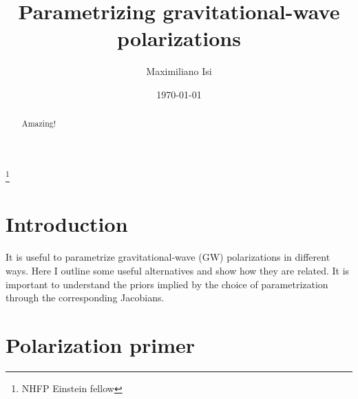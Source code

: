 \documentclass[aps,prd,twocolumn,superscriptaddress,preprintnumbers,floatfix,nofootinbib]{revtex4-2}
\newcommand{\dcc}{LIGO-PXXXXXXX}
\begin{document}

\title{Parametrizing gravitational-wave polarizations}

\author{Maximiliano Isi}
\thanks{NHFP Einstein fellow}
%


\date{\today}

\begin{abstract}
Amazing!
\end{abstract}

\maketitle


\section{Introduction}
\label{sec:intro}

It is useful to parametrize gravitational-wave (GW) polarizations in different ways.
Here I outline some useful alternatives and show how they are related.
It is important to understand the priors implied by the choice of parametrization through the corresponding Jacobians.

\section{Polarization primer}
\end{document}

